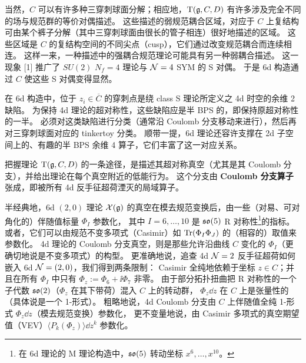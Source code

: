 当然，$C$ 可以有许多种三穿刺球面分解；相应地，$\mathrm{T}(\mathfrak{g},C,D)$ 有许多涉及完全不同的场与规范群的等价对偶描述。
这些描述的弱规范耦合区域，对应于 $C$ 上复结构可由某个裤子分解（其中三穿刺球面由很长的管子相连）很好地描述的区域。
这些区域是 $C$ 的复结构空间的不同尖点（cusp），它们通过改变规范耦合而连续相连。
这样一来，一种描述中的强耦合规范理论可能具有另一种弱耦合描述。
这一现象 [1] 推广了 $SU(2)$ $N_f=4$ 理论与 $\mathcal{N}=4$ SYM 的 S 对偶。
于是 6d 构造通过 $C$ 使这些 S 对偶变得显然。

在 6d 构造中，位于 $z_i\in\overline{C}$ 的穿刺点是绕 class S 理论所定义之 4d 时空的余维 2 缺陷。
为保持 4d 理论的超对称性，这些缺陷应是半 BPS 的，即保持原超对称性的一半。
必须对这类缺陷进行分类（通常沿 Coulomb 分支移动来进行），然后再对三穿刺球面对应的 tinkertoy 分类。
顺带一提，6d 理论还容许支撑在 2d 子空间上的、有趣的半 BPS 余维 4 算子，它们丰富了这一对应关系。

把握理论 $\mathrm{T}(\mathfrak{g},C,D)$ 的一条途径，是描述其超对称真空（尤其是其 Coulomb 分支），并给出理论在每个真空附近的低能行为。
这个分支由 \textbf{Coulomb 分支算子}张成，即被所有 4d 反手征超荷湮灭的局域算子。

半经典地，6d $(2,0)$ 理论 $\mathcal{X}(\mathfrak{g})$ 的真空在模去规范变换后，由一些（对易、可对角化的）伴随值标量 $\Phi_I$ 参数化，
其中 $I=6,\dots,10$ 是 $\mathfrak{so}(5)$ R 对称性\footnote{在 6d 理论的 M 理论构造中，$\mathfrak{so}(5)$ 转动坐标 $x^6,\dots,x^{10}$。}的指标。
或者，它们可以由规范不变多项式（Casimir）如 $\operatorname{Tr}(\Phi_I\Phi_J)$ 的（相容的）取值来参数化。
4d 理论的 Coulomb 分支真空，则是那些允许沿曲线 $C$ 变化的 $\Phi_I$（更确切地说是不变多项式）的构型。
更准确地说，追查 4d $\mathcal{N}=2$ 反手征超荷如何嵌入 6d $\mathcal{N}=(2,0)$，我们得到两条限制：
Casimir 全纯地依赖于坐标 $z\in C$；并且在所有 $\Phi_I$ 中只有 $\Phi_z:=\Phi_6+\ii\Phi_7$ 非零。
由于部分拓扑扭曲把 R 对称性的一个子代数 $\mathfrak{so}(2)$（$\Phi_z$ 在其下带荷）混入 $C$ 上的转动群，
$\Phi_z\dd z$ 在 $C$ 上是张量性的（具体说是一个 1-形式）。
粗略地说，4d Coulomb 分支由 $C$ 上伴随值全纯 1-形式 $\Phi_z\dd z$（模去规范变换）参数化，
更不变量地说，由 Casimir 多项式的真空期望值（VEV）$\langle P_k(\Phi_z)\rangle \dd z^k$ 参数化。

